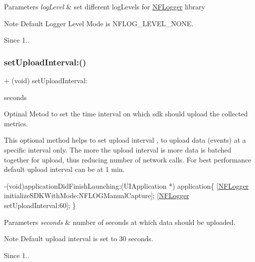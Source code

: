 \begin{DoxyParams}{Parameters}
{\em log\+Level} & set different log\+Levels for \hyperlink{interface_n_f_logger}{N\+F\+Logger} library \\
\hline
\end{DoxyParams}
\begin{DoxyNote}{Note}
Default Logger Level Mode is N\+F\+L\+O\+G\+\_\+\+L\+E\+V\+E\+L\+\_\+\+N\+O\+NE. 
\end{DoxyNote}
\begin{DoxySince}{Since}
1.. 
\end{DoxySince}
\mbox{\label{interface_n_f_logger_abab12d34a22ef54d94e9c1f32f785bbd}} 
\subsubsection{\texorpdfstring{set\+Upload\+Interval\+:()}{setUploadInterval:()}}
{\footnotesize\ttfamily + (void) set\+Upload\+Interval\+: \begin{DoxyParamCaption}\item[{(N\+S\+Integer)}]{seconds }\end{DoxyParamCaption}}



Optinal Metod to set the time interval on which sdk should upload the collected metrics. 

This optional method helps to set upload interval , to upload data (events) at a specific interval only. The more the upload interval is more data is batched together for upload, thus reducing number of network calls. For best performance default upload interval can be at 1 min.


\begin{DoxyCode}
-(void)applicationDidFinishLaunching:(UIApplication *) application\{
     [\hyperlink{interface_n_f_logger}{NFLogger} initializeSDKWithMode:NFLOGManualCapture];
     [\hyperlink{interface_n_f_logger}{NFLogger} setUploadInterval:60];
\}
\end{DoxyCode}



\begin{DoxyParams}{Parameters}
{\em seconds} & number of seconds at which data should be uploaded.\\
\hline
\end{DoxyParams}
\begin{DoxyNote}{Note}
Default upload interval is set to 30 seconds. 
\end{DoxyNote}
\begin{DoxySince}{Since}
1.. 
\end{DoxySince}
\mbox{\label{interface_n_f_logger_a2d98749d91d892500fab101747d06a71}} 
